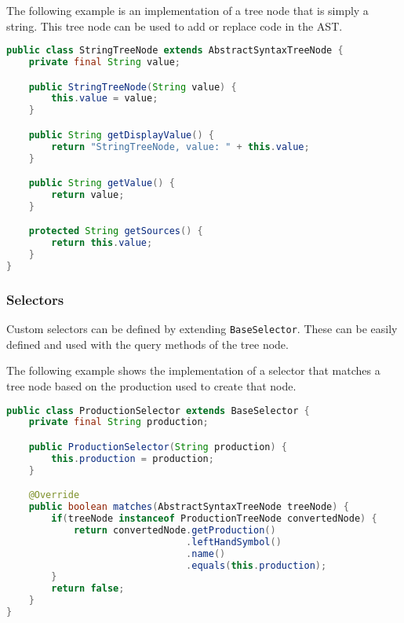 The following example is an implementation of a tree node that is simply a string.
This tree node can be used to add or replace code in the AST.

\begin{lstlisting}[language=Java, caption=Implementation of StringTreeNode]
public class StringTreeNode extends AbstractSyntaxTreeNode {
    private final String value;

    public StringTreeNode(String value) {
        this.value = value;
    }

    public String getDisplayValue() {
        return "StringTreeNode, value: " + this.value;
    }

    public String getValue() {
        return value;
    }

    protected String getSources() {
        return this.value;
    }
}
\end{lstlisting}

\subsubsection{Selectors}

Custom selectors can be defined by extending \verb|BaseSelector|. 
These can be easily defined and used with the query methods of the tree node.

The following example shows the implementation of a selector that matches a tree node based on the production used to create that node.

\begin{lstlisting}[language=Java,caption=Custom selector implementation]
public class ProductionSelector extends BaseSelector {
    private final String production;

    public ProductionSelector(String production) {
        this.production = production;
    }

    @Override
    public boolean matches(AbstractSyntaxTreeNode treeNode) {
        if(treeNode instanceof ProductionTreeNode convertedNode) {
            return convertedNode.getProduction()
                                .leftHandSymbol()
                                .name()
                                .equals(this.production);
        }
        return false;
    }
}
\end{lstlisting}
